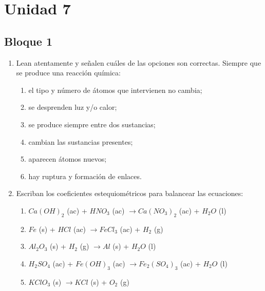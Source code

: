 \documentclass[../Práctica.root.tex]{subfiles}
\newcommand{\lra}{\ensuremath{\longrightarrow{}}}
\begin{document}
\section{Unidad 7}
\subsection{Bloque 1}
\begin{enumerate}
    \item Lean atentamente y señalen cuáles de las opciones son correctas.
          Siempre que se produce una reacción química:
          \begin{enumerate}
              \item el tipo y número de átomos que intervienen no cambia;
              \item se desprenden luz y/o calor;
              \item se produce siempre entre dos sustancias;
              \item cambian las sustancias presentes;
              \item aparecen átomos nuevos;
              \item hay ruptura y formación de enlaces.
          \end{enumerate}

    \item Escriban los coeficientes estequiométricos para balancear las ecuaciones:
          \begin{enumerate}
              \item $Ca(OH)_2$ (ac) + $HNO_3$ (ac) \lra $Ca(NO_3)_2$ (ac) + $H_2O$ (l)
              \item $Fe$ (s) + $HCl$ (ac) \lra $FeCl_3$ (ac) + $H_2$ (g)
              \item $Al_2O_3$ (s) + $H_2$ (g) \lra $Al$ (s) + $H_2O$ (l)
              \item $H_2SO_4$ (ac) + $Fe(OH)_3$ (ac) \lra $Fe_2(SO_4)_3$ (ac) + $H_2O$ (l)
              \item $KClO_3$ (s) \lra $KCl$ (s) + $O_2$ (g)
          \end{enumerate}


\end{enumerate}
\end{document}
